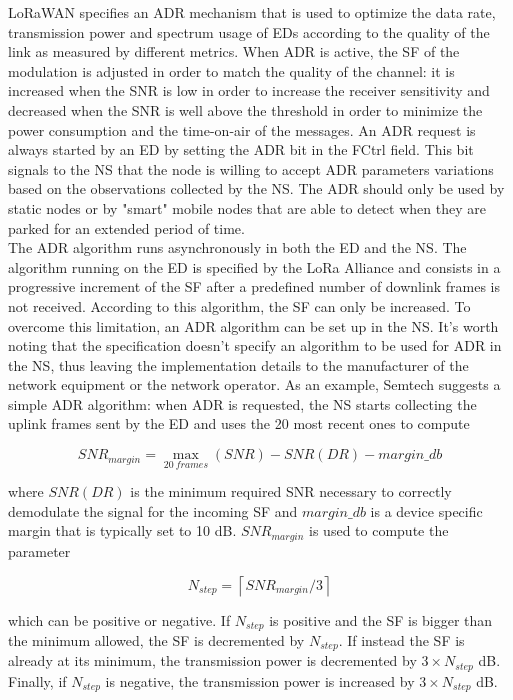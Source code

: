 LoRaWAN specifies an \gls{ADR} mechanism that is used to optimize the data rate, transmission power and spectrum usage of \glspl{ED} according to the quality of the link as measured by different metrics. When \gls{ADR} is active, the \gls{SF} of the modulation is adjusted in order to match the quality of the channel: it is increased when the \gls{SNR} is low in order to increase the receiver sensitivity and decreased when the \gls{SNR} is well above the threshold in order to minimize the power consumption and the time-on-air of the messages. An \gls{ADR} request is always started by an \gls{ED} by setting the \gls{ADR} bit in the FCtrl field. This bit signals to the \gls{NS} that the node is willing to accept \gls{ADR} parameters variations based on the observations collected by the \gls{NS}. The \gls{ADR} should only be used by static nodes or by "smart" mobile nodes that are able to detect when they are parked for an extended period of time. \\
The \gls{ADR} algorithm runs asynchronously in both the \gls{ED} and the \gls{NS}. The algorithm running on the \gls{ED} is specified by the LoRa Alliance and consists in a progressive increment of the \gls{SF} after a predefined number of downlink frames is not received. According to this algorithm, the \gls{SF} can only be increased. To overcome this limitation, an \gls{ADR} algorithm can be set up in the \gls{NS}. It's worth noting that the specification doesn't specify an algorithm to be used for \gls{ADR} in the \gls{NS}, thus leaving the implementation details to the manufacturer of the network equipment or the network operator. As an example, Semtech suggests a simple \gls{ADR} algorithm: when \gls{ADR} is requested, the \gls{NS} starts collecting the uplink frames sent by the \gls{ED} and uses the 20 most recent ones to compute

\begin{equation}
	SNR_{margin} = \max_{20 \ frames} (SNR) - SNR (DR) - margin\_db
\end{equation}

where $SNR (DR)$ is the minimum required SNR necessary to correctly demodulate the signal for the incoming \gls{SF} and $margin\_db$ is a device specific margin that is typically set to 10 dB. $SNR_{margin}$ is used to compute the parameter

\begin{equation}
	N_{step} = \left \lceil{SNR_{margin}/3} \right \rceil
\end{equation}

which can be positive or negative. If $N_{step}$ is positive and the \gls{SF} is bigger than the minimum allowed, the \gls{SF} is decremented by $N_{step}$. If instead the \gls{SF} is already at its minimum, the transmission power is decremented by $3 \times N_{step}$ dB. Finally, if $N_{step}$ is negative, the transmission power is increased by $3 \times N_{step}$ dB.


